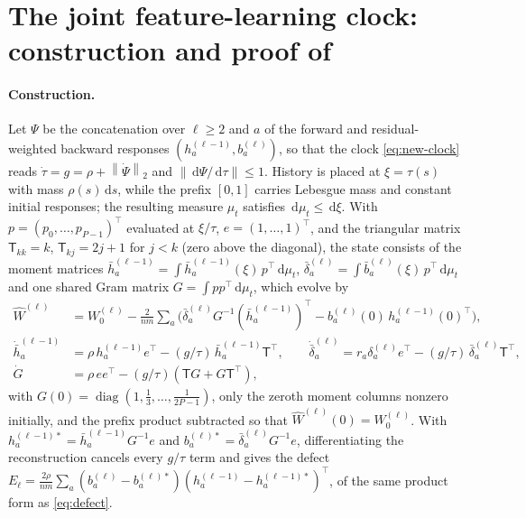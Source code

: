 \documentclass[11pt]{article}
\theoremstyle{definition}
\theoremstyle{remark}
\newcommand{\norm}[1]{\left\lVert #1\right\rVert}
\newcommand{\dd}{\,\mathrm{d}}
\newcommand{\diag}{\operatorname{diag}}
\begin{document}
\section{\texorpdfstring{The joint feature-learning clock: construction and proof of }{The joint feature-learning clock: construction and proof}}
\label{app:proof-new}

\paragraph{Construction.}
Let $\Psi$ be the concatenation over $\ell\ge2$ and $a$ of the forward and
residual-weighted backward responses $(h^{(\ell-1)}_a,b^{(\ell)}_a)$, so that the
clock \eqref{eq:new-clock} reads $\dot\tau=g=\rho+\norm{\dot\Psi}_2$ and
$\norm{\dd\Psi/\dd\tau}\le1$.  History is placed at $\xi=\tau(s)$ with mass
$\rho(s)\dd s$, while the prefix $[0,1]$ carries Lebesgue mass and constant
initial responses; the resulting measure $\mu_t$ satisfies $\dd\mu_t\le\dd\xi$.
With $p=(p_0,\ldots,p_{P-1})^\top$ evaluated at $\xi/\tau$, $e=(1,\ldots,1)^\top$,
and the triangular matrix $\mathsf T_{kk}=k$, $\mathsf T_{kj}=2j+1$ for $j<k$
(zero above the diagonal), the state consists of the moment matrices
$\bar h^{(\ell-1)}_a=\int\bar h^{(\ell-1)}_a(\xi)\,p^\top\dd\mu_t$,
$\bar\delta^{(\ell)}_a=\int\bar b^{(\ell)}_a(\xi)\,p^\top\dd\mu_t$ and one shared
Gram matrix $G=\int pp^\top\dd\mu_t$, which evolve by
\begin{align}
 \widehat W^{(\ell)}&=W_0^{(\ell)}-\frac{2}{nm}\sum_a
 \bigl(\bar\delta^{(\ell)}_aG^{-1}(\bar h^{(\ell-1)}_a)^\top
 -b^{(\ell)}_a(0)\,h^{(\ell-1)}_a(0)^\top\bigr),\nonumber\\
 \dot{\bar h}^{(\ell-1)}_a&=\rho\,h^{(\ell-1)}_ae^\top-(g/\tau)\,\bar h^{(\ell-1)}_a\mathsf T^\top,
 \qquad
 \dot{\bar\delta}^{(\ell)}_a=r_a\delta_a^{(\ell)}e^\top-(g/\tau)\,\bar\delta^{(\ell)}_a\mathsf T^\top,
 \nonumber\\
 \dot G&=\rho\,ee^\top-(g/\tau)(\mathsf TG+G\mathsf T^\top),     \label{eq:new-ode}
\end{align}
with $G(0)=\diag(1,\tfrac13,\ldots,\tfrac1{2P-1})$, only the zeroth moment
columns nonzero initially, and the prefix product subtracted so that
$\widehat W^{(\ell)}(0)=W_0^{(\ell)}$.  With $h^{(\ell-1)*}_a=\bar h^{(\ell-1)}_aG^{-1}e$
and $b^{(\ell)*}_a=\bar\delta^{(\ell)}_aG^{-1}e$, differentiating the
reconstruction cancels every $g/\tau$ term and gives the defect
$E_\ell=\frac{2\rho}{nm}\sum_a(b^{(\ell)}_a-b^{(\ell)*}_a)(h^{(\ell-1)}_a-h^{(\ell-1)*}_a)^\top$,
of the same product form as \eqref{eq:defect}.
\end{document}

